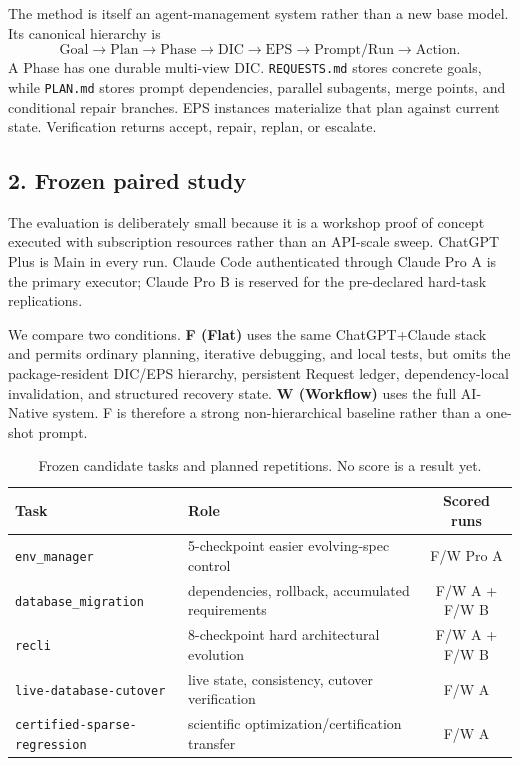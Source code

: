 \documentclass{article}
\begin{document}
The method is itself an agent-management system rather than a new base model. Its canonical hierarchy is
\[
\text{Goal}\to\text{Plan}\to\text{Phase}\to\text{DIC}\to\text{EPS}\to\text{Prompt/Run}\to\text{Action}.
\]
A Phase has one durable multi-view DIC. \texttt{REQUESTS.md} stores concrete goals, while \texttt{PLAN.md} stores prompt dependencies, parallel subagents, merge points, and conditional repair branches. EPS instances materialize that plan against current state. Verification returns accept, repair, replan, or escalate.

\subsection*{2. Frozen paired study}
The evaluation is deliberately small because it is a workshop proof of concept executed with subscription resources rather than an API-scale sweep. ChatGPT Plus is Main in every run. Claude Code authenticated through Claude Pro A is the primary executor; Claude Pro B is reserved for the pre-declared hard-task replications.

We compare two conditions. \textbf{F (Flat)} uses the same ChatGPT+Claude stack and permits ordinary planning, iterative debugging, and local tests, but omits the package-resident DIC/EPS hierarchy, persistent Request ledger, dependency-local invalidation, and structured recovery state. \textbf{W (Workflow)} uses the full AI-Native system. F is therefore a strong non-hierarchical baseline rather than a one-shot prompt.

\begin{table}[h]
\centering\small
\caption{Frozen candidate tasks and planned repetitions. No score is a result yet.}
\begin{tabularx}{\linewidth}{@{}l X c@{}}
\toprule
Task & Role & Scored runs\\\midrule
\texttt{env\_manager} & 5-checkpoint easier evolving-spec control & F/W Pro A\\
\texttt{database\_migration} & dependencies, rollback, accumulated requirements & F/W A + F/W B\\
\texttt{recli} & 8-checkpoint hard architectural evolution & F/W A + F/W B\\
\texttt{live-database-cutover} & live state, consistency, cutover verification & F/W A\\
\texttt{certified-sparse-regression} & scientific optimization/certification transfer & F/W A\\
\bottomrule
\end{tabularx}
\end{table}
\end{document}

